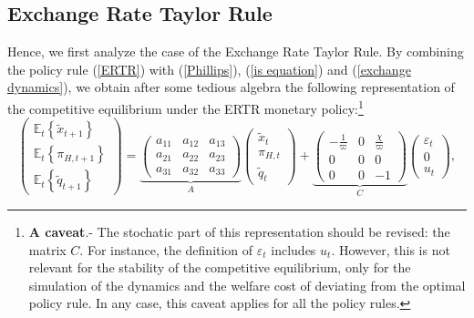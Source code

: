 \documentclass{article}
\begin{document}
\subsection{Exchange Rate Taylor Rule}

Hence, we first analyze the case of the Exchange Rate Taylor Rule. By
combining the policy rule (\ref{ERTR}) with (\ref{Phillips}), (\ref{is
equation}) and (\ref{exchange dynamics}), we obtain after some tedious
algebra the following representation of the competitive equilibrium under
the ERTR monetary policy:\footnote{\textbf{A caveat}.- The stochatic part of
this representation should be revised: the matrix $C.$ For instance, the
definition of $\varepsilon _{t}$ includes $u_{t}.$ However, this is not
relevant for the stability of the competitive equilibrium, only for the
simulation of the dynamics and the welfare cost of deviating from the
optimal policy rule. In any case, this caveat applies for all the policy
rules.}%
\begin{equation}
\left( 
\begin{array}{c}
\mathbb{E}_{t}\left\{ \widetilde{x}_{t+1}\right\} \\ 
\mathbb{E}_{t}\left\{ \pi _{H,t+1}\right\} \\ 
\mathbb{E}_{t}\left\{ \widetilde{q}_{t+1}\right\}%
\end{array}%
\right) =\underset{A}{\underbrace{\left( 
\begin{array}{ccc}
a_{11} & a_{12} & a_{13} \\ 
a_{21} & a_{22} & a_{23} \\ 
a_{31} & a_{32} & a_{33}%
\end{array}%
\right) }}\left( 
\begin{array}{c}
\widetilde{x}_{t} \\ 
\pi _{H,t} \\ 
\widetilde{q}_{t}%
\end{array}%
\right) +\underset{C}{\underbrace{\left( 
\begin{array}{ccc}
-\frac{1}{\varpi } & 0 & \frac{\chi }{\varpi } \\ 
0 & 0 & 0 \\ 
0 & 0 & -1%
\end{array}%
\right) }}\left( 
\begin{array}{c}
\varepsilon _{t} \\ 
0 \\ 
u_{t}%
\end{array}%
\right) ,  \label{ERTR solution}
\end{equation}%
\end{document}
